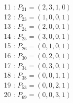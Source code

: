 \documentclass{article}
\begin{document}
{\begin{multicols}{3}
11 : $P_{21}=( 2, 3, 1, 0 )$\\
12 : $P_{23}=( 1, 0, 0, 1 )$\\
13 : $P_{24}=( 2, 0, 0, 1 )$\\
14 : $P_{25}=( 3, 0, 0, 1 )$\\
15 : $P_{26}=( 0, 1, 0, 1 )$\\
16 : $P_{30}=( 0, 2, 0, 1 )$\\
17 : $P_{34}=( 0, 3, 0, 1 )$\\
18 : $P_{38}=( 0, 0, 1, 1 )$\\
19 : $P_{53}=( 0, 0, 2, 1 )$\\
20 : $P_{69}=( 0, 0, 3, 1 )$\\
\end{multicols}


%


%


}%
\end{document}
